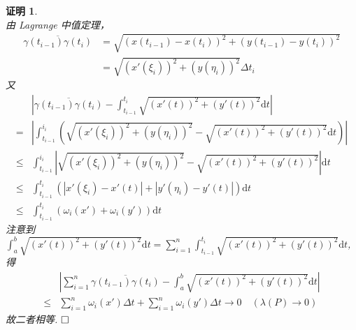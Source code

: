\documentclass{ctexart}
\newcommand{\。}{．} %
\newcommand{\dd}{\mathrm{d}}
\newenvironment{lanse}{
    \begin{tcolorbox}[enhanced, breakable, colback=qlan, boxrule=0pt, frame hidden,
        borderline west={0.7mm}{0.1mm}{slan}]
    }
    {\end{tcolorbox}}
\theoremstyle{t} %
\newtheorem*{zmhj}{\color{slan} 证明}
\newenvironment{zm}{\begin{lanse}\begin{zmhj}}{$\hfill \square$\end{zmhj}\end{lanse}}
\begin{document}
\begin{zm} \quad \\
    由 Lagrange 中值定理， 
    \begin{align*}
        \overline{\gamma(t_{i - 1})\gamma(t_i)} &= \sqrt{\left(x(t_{i - 1}) - x(t_i)\right)^2 + \left(y(t_{i - 1}) - y(t_i)\right)^2} \\
        &= \sqrt{\left(x'(\xi_i)\right)^2 + \left(y(\eta_i)\right)^2} \Delta t_i
    \end{align*}
    又
    \begin{align*}
        &\left\lvert \overline{\gamma(t_{i - 1})\gamma(t_i)} - \int_{t_{i - 1}}^{t_i}\sqrt{\left(x'(t)\right)^2 + \left(y'(t)\right)^2}\dd t \right\rvert \\
        = &\left\lvert \int_{t_{i - 1}}^{i_i}\left(\sqrt{\left(x'(\xi_i)\right)^2 + \left(y(\eta_i)\right)^2} - \sqrt{\left(x'(t)\right)^2 + \left(y'(t)\right)^2} \dd t\right)\right\rvert \\
        \leqslant &\int_{t_{i - 1}}^{i_i}\left|\sqrt{\left(x'(\xi_i)\right)^2 + \left(y(\eta_i)\right)^2} - \sqrt{\left(x'(t)\right)^2 + \left(y'(t)\right)^2}\right| \dd t \\
        \leqslant & \int_{t_{i - 1}}^{t_i}\left(\left\lvert x'(\xi_i) - x'(t)\right\rvert + \left\lvert y'(\eta_i) - y'(t)\right\rvert \right) \dd t \\
        \leqslant & \int_{t_{i - 1}}^{t_i}\left(\omega_i(x') + \omega_i(y')\right)\dd t
    \end{align*}
    注意到 $\int_{a}^{b}\sqrt{\left(x'(t)\right)^2 + \left(y'(t)\right)^2}\dd t = \sum_{i = 1}^{n}\int_{t_{i - 1}}^{t_i}\sqrt{\left(x'(t)\right)^2 + \left(y'(t)\right)^2}\dd t$, 得
    \begin{align*}
        & \left\lvert \sum_{i = 1}^{n}\overline{\gamma(t_{i - 1})\gamma(t_i)} - \int_{a}^{b}\sqrt{\left(x'(t)\right)^2 + \left(y'(t)\right)^2}\dd t\right\rvert \\
        \leqslant & \sum_{i = 1}^{n}\omega_i(x')\Delta t + \sum_{i = 1}^{n}\omega_i(y')\Delta t \to 0\quad (\lambda(P) \to 0)
    \end{align*}
    故二者相等.
\end{zm}
\end{document}

